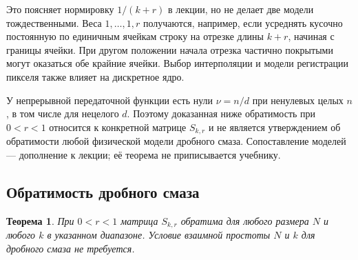 \documentclass[12pt,a4paper]{article}
\newtheorem{theorem}{Теорема}
\theoremstyle{definition}
\theoremstyle{remark}
\begin{document}
Это поясняет нормировку $1/(k+r)$ в лекции, но не делает две
модели тождественными. Веса $1,\ldots,1,r$ получаются, например,
если усреднять кусочно постоянную по единичным ячейкам строку
на отрезке длины $k+r$, начиная с границы ячейки.
При другом положении начала отрезка частично покрытыми могут
оказаться обе крайние ячейки. Выбор интерполяции и модели
регистрации пикселя также влияет на дискретное ядро.

У непрерывной передаточной функции есть нули
$\nu=n/d$ при ненулевых целых $n$, в том числе для нецелого $d$.
Поэтому доказанная ниже обратимость при $0<r<1$ относится
к конкретной матрице $S_{k,r}$ и не является утверждением
об обратимости любой физической модели дробного смаза.
Сопоставление моделей --- дополнение к лекции; её теорема
не приписывается учебнику.

\subsection{Обратимость дробного смаза}

\begin{theorem}
При $0<r<1$ матрица $S_{k,r}$ обратима для любого размера $N$ и
любого $k$ в указанном диапазоне. Условие взаимной простоты $N$ и $k$
для дробного смаза не требуется.
\end{theorem}
\end{document}
